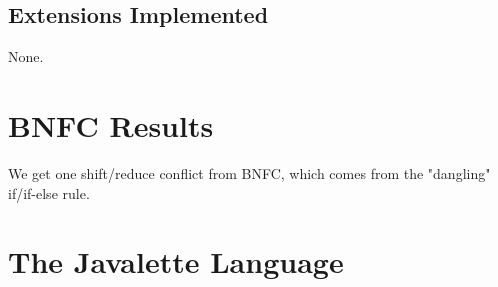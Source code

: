 \documentclass[]{article}
\begin{document}
  \subsection*{Extensions Implemented}
    None.

\section{BNFC Results}
  We get one shift/reduce conflict from BNFC, which comes from the "dangling" if/if-else rule.

\section{The Javalette Language}




\end{document}

